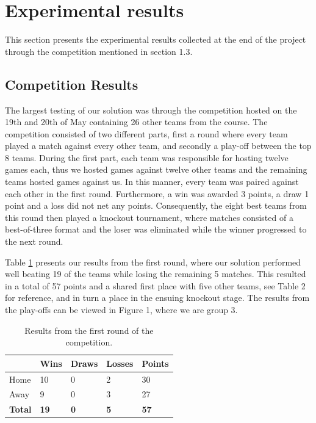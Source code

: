 \documentclass[a4paper,12pt]{article}
\begin{document}
\section{Experimental results}
\label{sec:exps}

This section presents the experimental results collected at the end of the project through the competition mentioned in section 1.3.


\subsection{Competition Results}
The largest testing of our solution was through the competition hosted on the 19th and 20th of May containing 26 other teams from the course. The competition consisted of two different parts, first a round where every team played a match against every other team, and secondly a play-off between the top 8 teams. During the first part, each team was responsible for hosting twelve games each, thus we hosted games against twelve other teams and the remaining teams hosted games against us. In this manner, every team was paired against each other in the first round. Furthermore, a win was awarded 3 points, a draw 1 point and a loss did not net any points. Consequently, the eight best teams from this round then played a knockout tournament, where matches consisted of a best-of-three format and the loser was eliminated while the winner progressed to the next round. 

Table \ref{tab:round1} presents our results from the first round, where our solution performed well beating 19 of the teams while losing the remaining 5 matches. This resulted in a total of 57 points and a shared first place with five other teams, see Table 2 for reference, and in turn a place in the ensuing knockout stage. The results from the play-offs can be viewed in Figure 1, where we are group 3.

\begin{table}[ht!]
    \centering
    \begin{tabular}{|l|l|l|l|l|}
        \hline
        & Wins        & Draws      & Losses     & Points      \\ \hline
        Home           & 10          & 0          & 2          & 30          \\ \hline
        Away           & 9           & 0          & 3          & 27          \\ \hline
        \textbf{Total} & \textbf{19} & \textbf{0} & \textbf{5} & \textbf{57} \\ \hline
    \end{tabular}
    \caption{Results from the first round of the competition.}
    \label{tab:round1}
\end{table}
\end{document}
